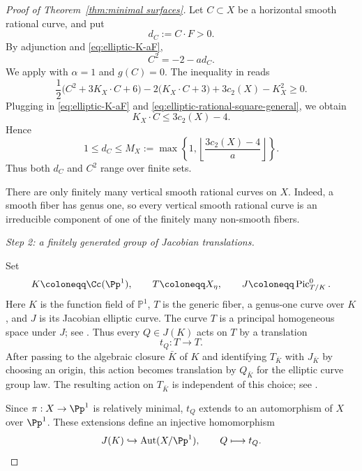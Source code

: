 \documentclass[12pt]{amsart}
\begin{document}
\begin{proof}[Proof of Theorem~\ref{thm:minimal surfaces}]
Let $C\subset X$ be a horizontal smooth rational curve, and put
\[
    d_C:=C\cdot F>0.
\]
By adjunction and \eqref{eq:elliptic-K-aF},
\begin{equation}\label{eq:elliptic-rational-square-general}
    C^2=-2-a d_C.
\end{equation}
We apply \cite[Theorem~1.3(i)]{Miy08} with $\alpha=1$ and $g(C)=0$.  The
inequality in \cite[Theorem~1.3(i)]{Miy08} reads
\[
 \frac12\bigl(C^2+3K_X\cdot C+6\bigr)
 -2\bigl(K_X\cdot C+3\bigr)
 +3c_2(X)-K_X^2\geq0.
\]
Plugging in \eqref{eq:elliptic-K-aF} and \eqref{eq:elliptic-rational-square-general}, we obtain
\[
    K_X\cdot C\leq 3c_2(X)-4.
\]
Hence
\begin{equation}\label{eq:uniform-degree-bound-general-genus-one}
    1\leq d_C\leq
    M_X:=\max\left\{1,
    \left\lfloor\frac{3c_2(X)-4}{a}\right\rfloor\right\}.
\end{equation}
Thus both $d_C$ and $C^2$ range over finite sets.

There are only finitely many vertical smooth rational curves on $X$.  Indeed,
a smooth fiber has genus one, so every vertical smooth rational curve is an
irreducible component of one of the finitely many non-smooth fibers.

\medskip
\noindent
\textit{Step 2: a finitely generated group of Jacobian translations.}

Set
\[
    K\coloneqq \Cc(\Pp^1),\qquad T\coloneqq X_\eta,
    \qquad J\coloneqq \operatorname{Pic}^0_{T/K}.
\] Here \(K\) is the function field of \(\mathbb P^1\), \(T\) is the generic fiber, a genus-one curve over \(K\), and \(J\) is its Jacobian elliptic curve. The curve $T$ is a 
principal homogeneous space under $J$; see \cite[Chapter~X, Exercise~10.3(a) and Theorem~3.8]{Sil09}. Thus every
$Q\in J(K)$ acts on $T$ by a translation
\[
    t_Q:T\longrightarrow T.
\]
After passing to the algebraic closure $\bar K$ of $K$ and
identifying $T_{\bar K}$ with $J_{\bar K}$ by choosing an origin,
this action becomes translation by $Q_{\bar K}$ for the elliptic
curve group law. The resulting action on $T_{\bar K}$ is independent
of this choice; see \cite[Chapter~III, Proposition~3.4 and
Chapter~X, Theorem~3.8]{Sil09}.


Since \(\pi:X\to \Pp^1\) is relatively minimal, \(t_Q\) extends to an automorphism of \(X\) over \(\Pp^1\). These extensions define an injective homomorphism
\begin{equation}\label{eq:t_Q}
   J(K)\hookrightarrow\operatorname{Aut}(X/\Pp^1),
\qquad Q\longmapsto t_Q. 
\end{equation}


\end{proof}
\end{document}
